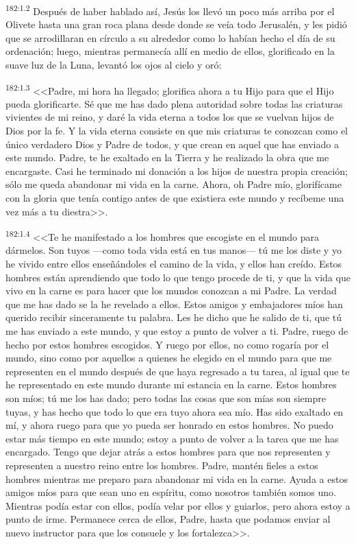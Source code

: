 \par 
\textsuperscript{182:1.2} Después de haber hablado así, Jesús los llevó un poco más arriba por el Olivete hasta una gran roca plana desde donde se veía todo Jerusalén, y les pidió que se arrodillaran en círculo a su alrededor como lo habían hecho el día de su ordenación; luego, mientras permanecía allí en medio de ellos, glorificado en la suave luz de la Luna, levantó los ojos al cielo y oró:

\par 
\textsuperscript{182:1.3} <<Padre, mi hora ha llegado; glorifica ahora a tu Hijo para que el Hijo pueda glorificarte. Sé que me has dado plena autoridad sobre todas las criaturas vivientes de mi reino, y daré la vida eterna a todos los que se vuelvan hijos de Dios por la fe. Y la vida eterna consiste en que mis criaturas te conozcan como el único verdadero Dios y Padre de todos, y que crean en aquel que has enviado a este mundo. Padre, te he exaltado en la Tierra y he realizado la obra que me encargaste. Casi he terminado mi donación a los hijos de nuestra propia creación; sólo me queda abandonar mi vida en la carne. Ahora, oh Padre mío, glorifícame con la gloria que tenía contigo antes de que existiera este mundo y recíbeme una vez más a tu diestra>>.

\par 
\textsuperscript{182:1.4} <<Te he manifestado a los hombres que escogiste en el mundo para dármelos. Son tuyos ---como toda vida está en tus manos--- tú me los diste y yo he vivido entre ellos enseñándoles el camino de la vida, y ellos han creído. Estos hombres están aprendiendo que todo lo que tengo procede de ti, y que la vida que vivo en la carne es para hacer que los mundos conozcan a mi Padre. La verdad que me has dado se la he revelado a ellos. Estos amigos y embajadores míos han querido recibir sinceramente tu palabra. Les he dicho que he salido de ti, que tú me has enviado a este mundo, y que estoy a punto de volver a ti. Padre, ruego de hecho por estos hombres escogidos. Y ruego por ellos, no como rogaría por el mundo, sino como por aquellos a quienes he elegido en el mundo para que me representen en el mundo después de que haya regresado a tu tarea, al igual que te he representado en este mundo durante mi estancia en la carne. Estos hombres son míos; tú me los has dado; pero todas las cosas que son mías son siempre tuyas, y has hecho que todo lo que era tuyo ahora sea mío. Has sido exaltado en mí, y ahora ruego para que yo pueda ser honrado en estos hombres. No puedo estar más tiempo en este mundo; estoy a punto de volver a la tarea que me has encargado. Tengo que dejar atrás a estos hombres para que nos representen y representen a nuestro reino entre los hombres. Padre, mantén fieles a estos hombres mientras me preparo para abandonar mi vida en la carne. Ayuda a estos amigos míos para que sean uno en espíritu, como nosotros también somos uno. Mientras podía estar con ellos, podía velar por ellos y guiarlos, pero ahora estoy a punto de irme. Permanece cerca de ellos, Padre, hasta que podamos enviar al nuevo instructor para que los consuele y los fortalezca>>.

